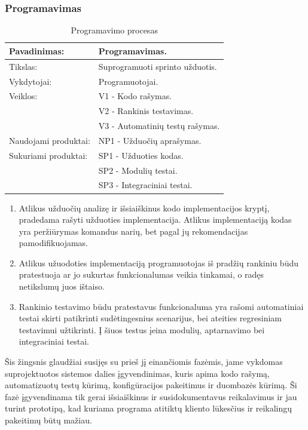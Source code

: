 \documentclass{VUMIFPSkursinis}
\begin{document}
	\subsubsection{Programavimas}
	\begin{center}
		\begin{table}[ht]
		\caption{Programavimo procesas}
		\begin{tabular}{ | l | l | } 
		\hline
		Pavadinimas:         & Programavimas.                      \\ \hline
		Tikslas: 	           & Suprogramuoti sprinto užduotis.      \\ \hline
		Vykdytojai:          & Programuotojai.                       \\ \hline
		Veiklos:             & V1 - Kodo rašymas. 									  \\
						             & V2 - Rankinis testavimas. 							 \\
					 	             & V3 - Automatinių testų rašymas. 					\\ \hline
		Naudojami produktai: & NP1 - Užduočių aprašymas.								 \\ \hline
		Sukuriami produktai: & SP1 - Užduoties kodas. 							  		\\
												 & SP2 - Modulių testai. 											 \\
												 & SP3 - Integraciniai testai. 									\\ \hline
		\end{tabular}
	\end{table}
		\end{center}
		\begin{enumerate}
			\item Atlikus užduočių analizę ir išsiaiškinus kodo implementacijos kryptį, pradedama rašyti užduoties implementacija. Atlikus implementaciją kodas yra peržiūrymas komandus narių, bet pagal jų rekomendacijas pamodifikuojamas.
			\item Atlikus užuodoties implementaciją programuotojas iš pradžių rankiniu būdu pratestuoja ar jo sukurtas funkcionalumas veikia tinkamai, o radęs netikslumų juos ištaiso.
			\item Rankinio testavimo būdu pratestavus funkcionaluma yra rašomi automatiniai testai skirti patikrinti sudėtingesnius scenarijus, bei ateities regresiniam testavimui užtikrinti. Į šiuos testus įeina modulių, aptarnavimo bei integraciniai testai.
		\end{enumerate}
	Šis žingsnis glaudžiai susijęs su prieš jį einančiomis fazėmis, jame vykdomas suprojektuotos sistemos dalies įgyvendinimas, kuris apima kodo rašymą, automatizuotų testų kūrimą, konfigūracijos pakeitimus ir duombazės kūrimą. Ši fazė įgyvendinama tik gerai išsiaiškinus ir susidokumentavus reikalavimus ir jau turint prototipą, kad kuriama programa atitiktų kliento lūkesčius ir reikalingų pakeitimų būtų mažiau.
\end{document}
